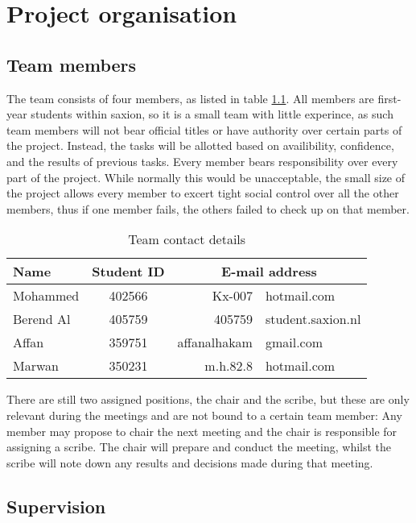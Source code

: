 \chapter{Project organisation}

\section{Team members}

The team consists of four members, as listed in table \ref{tbl:contactdetails}. All members are first-year students within saxion, so it is a small team with little experince, as such team members will not bear official titles or have authority over certain parts of the project. Instead, the tasks will be allotted based on availibility, confidence, and the results of previous tasks. Every member bears responsibility over every part of the project. While normally this would be unacceptable, the small size of the project allows every member to excert tight social control over all the other members, thus if one member fails, the others failed to check up on that member.

\begin{table}
\centering
\caption{Team contact details}
\begin{tabular}{lc r @{@} l}
\\
Name & Student ID & \multicolumn{2}{c}{E-mail address} \\
\hline
Mohammed & 402566 & Kx-007&hotmail.com \\
Berend Al & 405759 & 405759&student.saxion.nl \\
Affan & 359751 & affanalhakam&gmail.com \\
Marwan & 350231 & m.h.82.8&hotmail.com \\
\end{tabular}
\label{tbl:contactdetails}
\end{table}

There are still two assigned positions, the chair and the scribe, but these are only relevant during the meetings and are not bound to a certain team member: Any member may propose to chair the next meeting and the chair is responsible for assigning a scribe. The chair will prepare and conduct the meeting, whilst the scribe will note down any results and decisions made during that meeting.

\section{Supervision}

